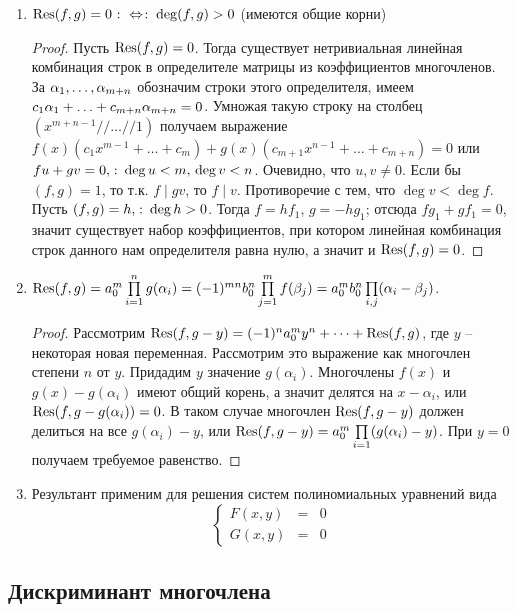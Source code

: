 \begin{enumerate}
  \item $\operatorname{Res}(f,g)=0 \mathbin{\colon\Leftrightarrow\colon} \deg(f,g)>0$ (имеются общие корни)
    \begin{proof}
      Пусть $\operatorname{Res}(f,g)=0$. Тогда существует нетривиальная линейная комбинация строк в определителе матрицы из коэффициентов многочленов. За $\alpha_1,\dots,\alpha_{m+n}$ обозначим строки этого определителя, имеем $c_1\al_1\bw+\dots\bw+c_{m+n}\al_{m+n}=0$. Умножая такую строку на столбец $(x^{m+n-1} // \dots // 1)$ получаем выражение $f(x)(c_1x^{m-1}+\dots+c_m)+g(x)(c_{m+1}x^{n-1}+\dots+c_{m+n})=0$ или $fu+gv=0,\colon\deg u<m,\,\deg v<n$. Очевидно, что $u,v\ne0$. Если бы $(f,g)=1$, то т.к. $f\mid gv$, то $f\mid v$. Противоречие с тем, что $\deg v<\deg f$.\\
      
      Пусть $(f,g)=h,\colon \deg h>0$. Тогда $f=hf_1$, $g=-hg_1$; отсюда $fg_1+gf_1=0$, значит существует набор коэффициентов, при котором линейная комбинация строк данного нам определителя равна нулю, а значит и $\operatorname{Res}(f,g)=0$.
    \end{proof}
  \item $\operatorname{Res}(f,g)=a_0^m\prod\limits_{i=1}^n g(\alpha_i)=(-1)^{mn}b_0^n\prod\limits_{j=1}^m f(\beta_j)=a_0^mb_0^n\prod\limits_{i,j}(\alpha_i-\beta_j)$.
    \begin{proof}
      Рассмотрим $\operatorname{Res}(f,g-y)=(-1)^na_0^my^n+\dots+\operatorname{Res}(f,g)$, где $y$ -- некоторая новая переменная. Рассмотрим это выражение как многочлен степени $n$ от $y$. Придадим $y$ значение $g(\alpha_i)$. Многочлены $f(x)$ и $g(x)-g(\alpha_i)$ имеют общий корень, а значит делятся на $x-\alpha_i$, или $\operatorname{Res}(f,g-g(\alpha_i))=0$. В таком случае многочлен $\operatorname{Res}(f,g-y)$ должен делиться на все $g(\alpha_i)-y$, или $\operatorname{Res}(f,g-y)=a_0^m\prod\limits_{i=1}(g(\alpha_i)-y)$. При $y=0$ получаем требуемое равенство.
    \end{proof}
  \item Результант применим для решения систем полиномиальных уравнений вида
    $$
      \left\{\begin{array}{lcl}
        F(x,y) &=& 0\\
        G(x,y) &=& 0
      \end{array}\right.
    $$
\end{enumerate}

\subsection{Дискриминант многочлена}

